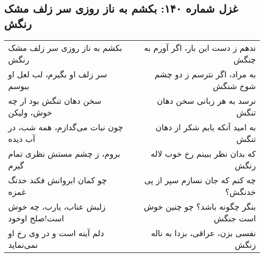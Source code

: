 \begin{center}
\section*{غزل شماره ۱۴۰: بکشم به ناز روزی سر زلف مشک رنگش}
\label{sec:140}
\begin{longtable}{l p{0.5cm} r}
بکشم به ناز روزی سر زلف مشک رنگش
&&
ندهم ز دست این بار، اگر آورم به چنگش
\\
سر زلف او بگیرم، لب لعل او ببوسم
&&
به مراد، اگر نترسم ز دو چشم شوخ شنگش
\\
سخن دهان تنگش بود ار چه خوش، ولیکن
&&
نرسد به هر زبانی سخن دهان تنگش
\\
چون نبات می‌گدازم، همه شب، در آب دیده
&&
به امید آنکه یابم شکر از دهان تنگش
\\
بروم، ز چشم مستش نظری تمام گیرم
&&
که بدان نظر ببینم رخ خوب لاله رنگش
\\
چو کمان ابروانش فکند خدنگ غمزه
&&
چه کنم که جان نسازم سپر از پی خدنگش؟
\\
زلبش عناب، یارب، چه خوش است!صلح اوخود
&&
بنگر چگونه باشد؟ چو چنین خوش است جنگش
\\
دلم آینه است و در وی رخ او نمی‌نماید
&&
نفسی بزن، عراقی، بزدا به ناله زنگش
\\
\end{longtable}
\end{center}
